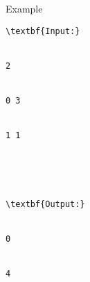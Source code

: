 Example
\begin{verbatim}
\textbf{Input:}


2


0 3


1 1





\textbf{Output:}


0


4\end{verbatim}